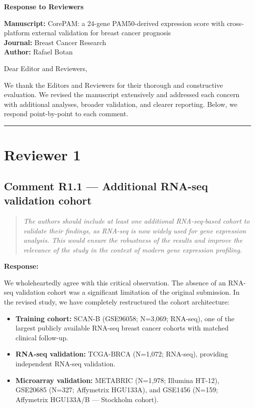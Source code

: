 \documentclass[11pt]{article}
\newcommand{\reviewerquote}[1]{\begin{quote}\itshape #1\end{quote}}
\begin{document}
\begin{center}
{\Large\bfseries Response to Reviewers}
\end{center}

\bigskip

\noindent\textbf{Manuscript:} CorePAM: a 24-gene PAM50-derived expression score with cross-platform external validation for breast cancer prognosis\\
\textbf{Journal:} Breast Cancer Research\\
\textbf{Author:} Rafael Botan

\bigskip

Dear Editor and Reviewers,

We thank the Editors and Reviewers for their thorough and constructive evaluation. We revised the manuscript extensively and addressed each concern with additional analyses, broader validation, and clearer reporting. Below, we respond point-by-point to each comment.

\bigskip\hrule\bigskip

\section*{Reviewer 1}

\subsection*{Comment R1.1 --- Additional RNA-seq validation cohort}

\reviewerquote{The authors should include at least one additional RNA-seq-based cohort to validate their findings, as RNA-seq is now widely used for gene expression analysis. This would ensure the robustness of the results and improve the relevance of the study in the context of modern gene expression profiling.}

\noindent\textbf{Response:}

We wholeheartedly agree with this critical observation. The absence of an RNA-seq validation cohort was a significant limitation of the original submission. In the revised study, we have completely restructured the cohort architecture:

\begin{itemize}
  \item \textbf{Training cohort:} SCAN-B (GSE96058; N=3,069; RNA-seq), one of the largest publicly available RNA-seq breast cancer cohorts with matched clinical follow-up.
  \item \textbf{RNA-seq validation:} TCGA-BRCA (N=1,072; RNA-seq), providing independent RNA-seq validation.
  \item \textbf{Microarray validation:} METABRIC (N=1,978; Illumina HT-12), GSE20685 (N=327; Affymetrix HGU133A), and GSE1456 (N=159; Affymetrix HGU133A/B --- Stockholm cohort).
\end{itemize}
\end{document}
